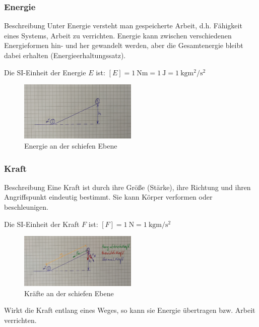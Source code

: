 \documentclass{article}
\begin{document}
\frame
{
  \frametitle{Energie}
\begin{block}{Beschreibung}
Unter Energie versteht man gespeicherte Arbeit, d.h. Fähigkeit eines Systems, Arbeit zu verrichten. Energie kann zwischen verschiedenen Energieformen hin- und her gewandelt werden, aber die Gesamtenergie bleibt dabei erhalten (Energieerhaltungssatz).
\end{block}
Die SI-Einheit der Energie $E$ ist:
$[E]=\SI{1}{\newton\meter}=\SI{1}{\joule}=\SI{1}{\kilo\gram\square\meter\per\square\second}$
      \begin{figure}
	  \includegraphics[width=0.5\textwidth]{Energie_1}
	  \vspace{-3mm}
	  \caption{Energie an der schiefen Ebene}
   \end{figure}
}

\frame
{
  \frametitle{Kraft}
\begin{block}{Beschreibung}
Eine Kraft ist durch ihre Größe (Stärke), ihre Richtung und ihren Angriffspunkt eindeutig bestimmt. Sie kann Körper verformen oder beschleunigen.
\end{block}
Die SI-Einheit der Kraft $F$ ist:
$[F]=\SI{1}{\newton}=\SI{1}{\kilo\gram\meter\per\square\second}$
      \begin{figure}
	  \includegraphics[width=0.5\textwidth]{Kraft}
	  \vspace{-3mm}
	  \caption{Kräfte an der schiefen Ebene}
   \end{figure}
     Wirkt die Kraft entlang eines Weges, so kann sie Energie übertragen bzw. Arbeit verrichten.
}
\end{document}
